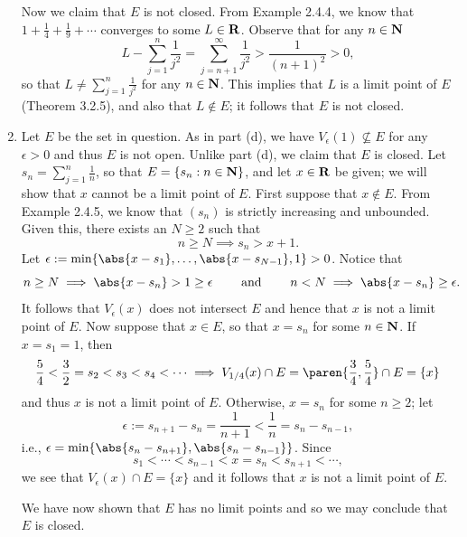 \documentclass{lew98_solutions}
\begin{document}
\begin{solution}
\begin{enumerate}
        Now we claim that \( E \) is not closed. From Example 2.4.4, we know that \( 1 + \tfrac{1}{4} + \tfrac{1}{9} + \cdots \) converges to some \( L \in \mathbf{R} \). Observe that for any \( n \in \mathbf{N} \)
        \[
            L - \sum_{j=1}^n \frac{1}{j^2} = \sum_{j=n+1}^{\infty} \frac{1}{j^2} > \frac{1}{(n+1)^2} > 0,
        \]
        so that \( L \neq \sum_{j=1}^n \tfrac{1}{j^2} \) for any \( n \in \mathbf{N} \). This implies that \( L \) is a limit point of \( E \) (Theorem 3.2.5), and also that \( L \not\in E \); it follows that \( E \) is not closed.

        \item Let \( E \) be the set in question. As in part (d), we have \( V_{\epsilon}(1) \not\subseteq E \) for any \( \epsilon > 0 \) and thus \( E \) is not open. Unlike part (d), we claim that \( E \) is closed. Let \( s_n = \sum_{j=1}^n \tfrac{1}{n} \), so that \( E = \{ s_n : n \in \mathbf{N} \} \), and let \( x \in \mathbf{R} \) be given; we will show that \( x \) cannot be a limit point of \( E \). First suppose that \( x \not\in E \). From Example 2.4.5, we know that \( (s_n) \) is strictly increasing and unbounded. Given this, there exists an \( N \geq 2 \) such that
        \[
            n \geq N \implies s_n > x + 1.
        \]
        Let \( \epsilon := \min \{ \abs{x - s_1}, \ldots, \abs{x - s_{N-1}}, 1 \} > 0 \). Notice that
        \[
            n \geq N \implies \abs{x - s_n} > 1 \geq \epsilon \hspaceand n < N \implies \abs{x - s_n} \geq \epsilon.
        \]
        It follows that \( V_{\epsilon}(x) \) does not intersect \( E \) and hence that \( x \) is not a limit point of \( E \). Now suppose that \( x \in E \), so that \( x = s_n \) for some \( n \in \mathbf{N} \). If \( x = s_1 = 1 \), then
        \[
            \frac{5}{4} < \frac{3}{2} = s_2 < s_3 < s_4 < \cdots \implies V_{1/4}(x) \cap E = \paren{ \frac{3}{4}, \frac{5}{4} } \cap E = \{ x \}
        \]
        and thus \( x \) is not a limit point of \( E \). Otherwise, \( x = s_n \) for some \( n \geq 2 \); let
        \[
            \epsilon := s_{n+1} - s_n = \frac{1}{n+1} < \frac{1}{n} = s_n - s_{n-1},
        \]
        i.e., \( \epsilon = \min \{ \abs{s_n - s_{n+1}}, \abs{s_n - s_{n-1}} \} \). Since
        \[
            s_1 < \cdots < s_{n-1} < x = s_n < s_{n+1} < \cdots,
        \]
        we see that \( V_{\epsilon}(x) \cap E = \{ x \} \) and it follows that \( x \) is not a limit point of \( E \).

        We have now shown that \( E \) has no limit points and so we may conclude that \( E \) is closed.
    \end{enumerate}
\end{solution}
\end{document}
